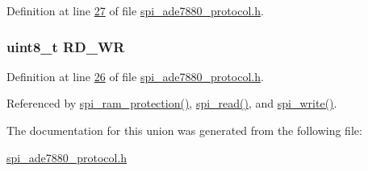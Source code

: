 Definition at line \hyperlink{a00041_source_l00027}{27} of file \hyperlink{a00041_source}{spi\-\_\-ade7880\-\_\-protocol.\-h}.

\hypertarget{a00011_a97e2668c8e5470fa66185f16dc2e8045}{
\subsubsection[{R\-D\-\_\-\-W\-R}]{\setlength{\rightskip}{0pt plus 5cm}uint8\-\_\-t R\-D\-\_\-\-W\-R}}\label{da/d45/a00011_a97e2668c8e5470fa66185f16dc2e8045}


Definition at line \hyperlink{a00041_source_l00026}{26} of file \hyperlink{a00041_source}{spi\-\_\-ade7880\-\_\-protocol.\-h}.



Referenced by \hyperlink{a00040_source_l00343}{spi\-\_\-ram\-\_\-protection()}, \hyperlink{a00040_source_l00147}{spi\-\_\-read()}, and \hyperlink{a00040_source_l00221}{spi\-\_\-write()}.



The documentation for this union was generated from the following file\-:\begin{DoxyCompactItemize}
\item 
\hyperlink{a00041}{spi\-\_\-ade7880\-\_\-protocol.\-h}\end{DoxyCompactItemize}
